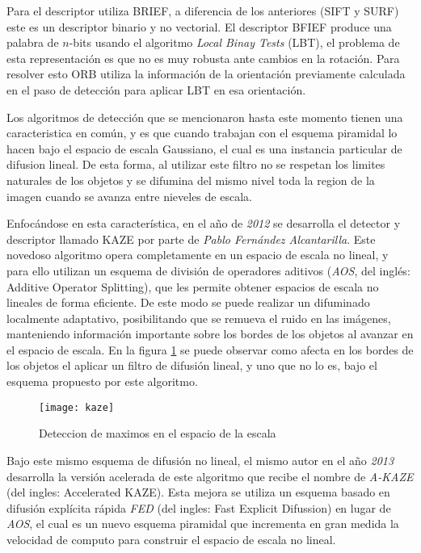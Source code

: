 Para el descriptor utiliza BRIEF, a diferencia de los anteriores (SIFT y SURF) este es un descriptor binario y no vectorial. El descriptor BFIEF produce una palabra de $n$-bits usando el algoritmo \textit{Local Binay Tests} (LBT), el problema de esta representación es que no es muy robusta ante cambios en la rotación. Para resolver esto ORB utiliza la información de la orientación previamente calculada en el paso de detección para aplicar LBT en esa orientación.

Los algoritmos de detección que se mencionaron hasta este momento tienen una caracteristica en común, y es que cuando trabajan con el esquema piramidal lo hacen bajo el espacio de escala Gaussiano, el cual es una instancia particular de difusion lineal. De esta forma, al utilizar este filtro no se respetan los limites naturales de los objetos y se difumina del mismo nivel toda la region de la imagen cuando se avanza entre nieveles de escala.

Enfocándose en esta característica, en el año de \textit{2012} se desarrolla el detector y descriptor llamado KAZE \cite{kaze} por parte de \textit{Pablo Fernández Alcantarilla}. Este novedoso algoritmo opera completamente en un espacio de escala no lineal, y para ello utilizan un esquema de división de operadores aditivos (\textit{AOS}, del inglés: Additive Operator Splitting), que les permite obtener espacios de escala no lineales de forma eficiente. De este modo se puede realizar un difuminado localmente adaptativo, posibilitando que se remueva el ruido en las imágenes, manteniendo información importante sobre los bordes de los objetos al avanzar en el espacio de escala. En la figura \ref{imagen:kaze} se puede observar como afecta en los bordes de los objetos el aplicar un filtro de difusión lineal, y uno que no lo es, bajo el esquema propuesto por este algoritmo.

\begin{figure}[H]
	\centering
	\texttt{[image: kaze]}
	\caption[KAZE - Espacio de escalas]{Deteccion de maximos en el espacio de la escala}
	\label{imagen:kaze}
\end{figure}

Bajo este mismo esquema de difusión no lineal, el mismo autor en el año \textit{2013} desarrolla la versión acelerada de este algoritmo que recibe el nombre de \textit{A-KAZE} \cite{akaze} (del ingles: Accelerated KAZE). Esta mejora se utiliza un esquema basado en difusión explícita rápida \textit{FED} (del ingles: Fast Explicit Difussion) en lugar de \textit{AOS}, el cual es un nuevo esquema piramidal que incrementa en gran medida la velocidad de computo para construir el espacio de escala no lineal.

